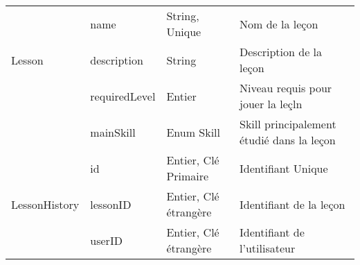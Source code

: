 \begin{longtable}[c]{@{}|p{}|p{}|p{}|p{}|@{}}
														& name                                                 & String, Unique                                                                           & Nom de la leçon                                                                          \\* \cmidrule(l){2-4} 
	\multirow{-3}{*}{Lesson}							& description                                          & String                                                                                   & Description de la leçon                                                                  \\* \cmidrule(l){2-4} 
														& requiredLevel                                        & Entier                                                                                   & Niveau requis pour jouer la leçln                                                        \\* \cmidrule(l){2-4} 
							                            & mainSkill                                            & Enum Skill                                                                               & Skill principalement étudié dans la leçon                                                \\* \midrule
														& id                                                   & Entier, Clé Primaire                                                                     & Identifiant Unique                                                                       \\* \cmidrule(l){2-4} 
	\multirow{-2}{*}{LessonHistory}						& lessonID                                             & Entier, Clé étrangère                                                                    & Identifiant de la leçon                                                                  \\* \cmidrule(l){2-4} 
									                    & userID                                               & Entier, Clé étrangère                                                                    & Identifiant de l'utilisateur                                                             \\* \bottomrule
\end{longtable}